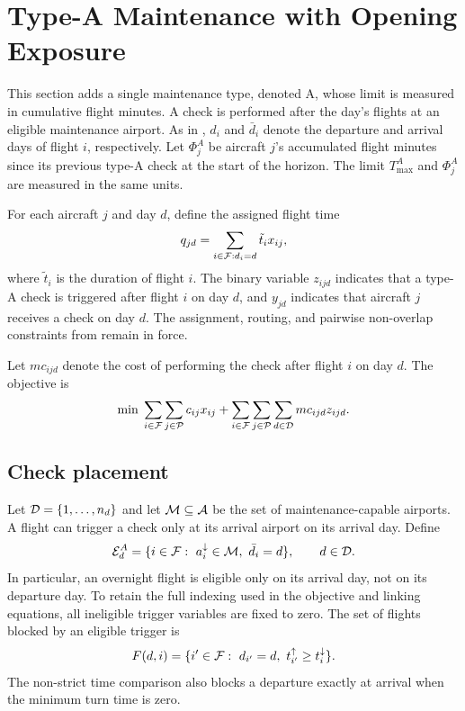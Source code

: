 \section{Type-A Maintenance with Opening Exposure}
\label{sec:maintenance}

This section adds a single maintenance type, denoted A, whose limit is
measured in cumulative flight minutes. A check is performed after the day's
flights at an eligible maintenance airport. As in , $d_i$
and $\bar d_i$ denote the departure and arrival days of flight $i$,
respectively. Let $\Phi^A_j$ be aircraft $j$'s accumulated flight minutes
since its previous type-A check at the start of the horizon. The limit
$T^A_{\max}$ and $\Phi^A_j$ are measured in the same units.

For each aircraft $j$ and day $d$, define the assigned flight time
\begin{equation}\label{eq:a_daily_hours}
  q_{jd} = \sum_{i\in\mathcal{F}: d_i=d} \tilde{t}_i x_{ij},
\end{equation}
where $\tilde{t}_i$ is the duration of flight $i$. The binary variable
$z_{ijd}$ indicates that a type-A check is triggered after flight $i$ on day
$d$, and $y_{jd}$ indicates that aircraft $j$ receives a check on day $d$.
The assignment, routing, and pairwise non-overlap constraints from
 remain in force.

Let $mc_{ijd}$ denote the cost of performing the check after flight $i$ on
day $d$. The objective is
\begin{equation}\label{eq:a_obj}
  \min\; \sum_{i\in\mathcal{F}}\sum_{j\in\mathcal{P}}c_{ij}x_{ij}
    +\sum_{i\in\mathcal{F}}\sum_{j\in\mathcal{P}}\sum_{d\in\mathcal{D}}mc_{ijd}z_{ijd}.
\end{equation}

\subsection{Check placement}

Let $\mathcal{D}=\{1,\ldots,n_d\}$ and let $\mathcal{M}\subseteq\mathcal{A}$ be the set of
maintenance-capable airports. A flight can trigger a check only at its
arrival airport on its arrival day. Define
\begin{equation}\label{eq:a_check_candidates}
  \mathcal{E}^A_d
  =\{i\in\mathcal{F}:\ a^{\downarrow}_{i}\in\mathcal{M},\ \bar d_i=d\},
  \qquad d\in\mathcal{D}.
\end{equation}
In particular, an overnight flight is eligible only on its arrival day,
not on its departure day. To retain the full indexing used in the objective
and linking equations, all ineligible trigger variables are fixed to zero.
The set of flights blocked by an eligible trigger is
\begin{equation}\label{eq:a_check_later_flights}
  F(d,i)=\{i'\in\mathcal{F}:\ d_{i'}=d,\ t^{\uparrow}_{i'}\ge t^{\downarrow}_{i}\}.
\end{equation}
The non-strict time comparison also blocks a departure exactly at arrival
when the minimum turn time is zero.

